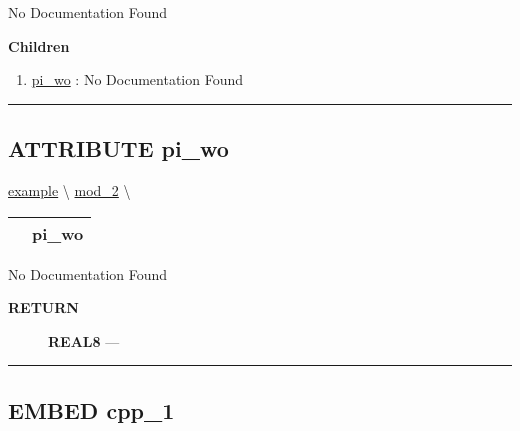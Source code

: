 \par





No Documentation Found







\textbf{Children}
\begin{enumerate}
\item \hyperlink{ecldoc:example.mod_2.pi_wo}{pi\_wo}
: No Documentation Found
\end{enumerate}

\rule{\linewidth}{0.5pt}

\subsection*{\textsf{\colorbox{headtoc}{\color{white} ATTRIBUTE}
pi\_wo}}

\hypertarget{ecldoc:example.mod_2.pi_wo}{}
\hspace{0pt} \hyperlink{ecldoc:example}{example} \textbackslash 
\hspace{0pt} \hyperlink{ecldoc:example.mod_2}{mod_2} \textbackslash 

{\renewcommand{\arraystretch}{1.5}
\begin{tabularx}{\textwidth}{|>{\raggedright\arraybackslash}l|X|}
\hline
\hspace{0pt}\mytexttt{\color{red} } & \textbf{pi\_wo} \\
\hline
\end{tabularx}
}

\par





No Documentation Found








\par
\begin{description}
\item [\colorbox{tagtype}{\color{white} \textbf{\textsf{RETURN}}}] \textbf{REAL8} --- 
\end{description}




\rule{\linewidth}{0.5pt}


\subsection*{\textsf{\colorbox{headtoc}{\color{white} EMBED}
cpp\_1}}

